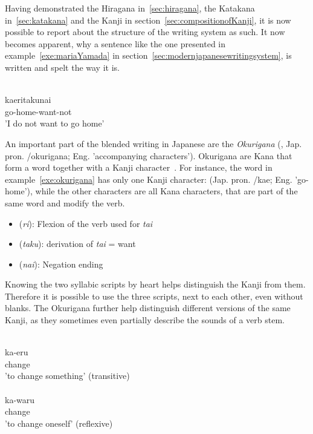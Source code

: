 Having demonstrated the Hiragana in~\ref{sec:hiragana}, the Katakana 
in~\ref{sec:katakana} and the Kanji in section~\ref{sec:compositionofKanji}, 
it is now possible to report about the structure of the writing system as such.
It now becomes apparent, why a sentence like the one presented in 
example~\ref{exe:mariaYamada} in section~\ref{sec:modernjapanesewritingsystem},
is written and spelt the way it is.
\begin{exe}
\ex\label{exe:okurigana}
\gll 
  \\
 kaeritakunai \\
 go-home-want-not \\
\trans 'I do not want to go home' \\
\end{exe}
An important part of the blended writing in Japanese are the 
\emph{Okurigana} (, Jap. pron. /okurigana; 
Eng. 'accompanying characters'). Okurigana are Kana that form 
a word together with a Kanji character~.
For instance, the word in example~\ref{exe:okurigana} has only one Kanji 
character:  (Jap. pron. /kae; Eng. 'go-home'), while the other characters are all Kana characters, that are part of the same word and modify
the verb.
\begin{itemize}
  \item {} (\emph{ri}): Flexion of the verb used for \emph{tai}
  \item {} (\emph{taku}): derivation of \emph{tai} = want
  \item {} (\emph{nai}): Negation ending
\end{itemize}
Knowing the two syllabic scripts by heart helps distinguish the Kanji from them.
Therefore it is possible to use the three scripts, next to each other, even 
without blanks. The Okurigana further help distinguish different versions of 
the same Kanji, as they sometimes even partially describe the sounds of a 
verb stem.
\begin{exe}
\ex\label{exe:stemspelling}
\begin{xlist}
\ex\label{exe:stemspellingkaeru}
\gll 
  \\
 ka-eru \\
 change \\
\trans 'to change something' (transitive) \\

\ex\label{exe:stemspellingkawaru}
\gll 
  \\
 ka-waru \\
 change \\
\trans 'to change oneself' (reflexive) \\
\end{xlist}
\end{exe}
